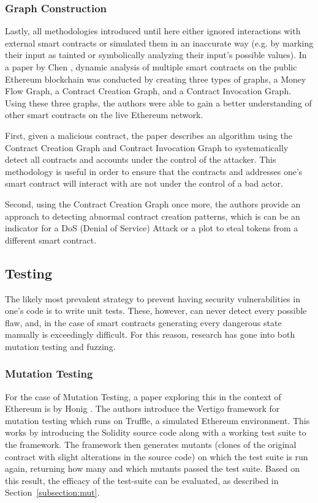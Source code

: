 \documentclass[letterpaper,twocolumn,10pt]{article}
\begin{document}
\subsubsection{Graph Construction}
Lastly, all methodologies introduced until here either ignored interactions with external smart contracts or simulated them in an inaccurate way (e.g. by marking their input as tainted or symbolically analyzing their input's possible values). In a paper by Chen \cite{chen_zhu_li_chen_li_luo_lin_zhange_2018}, dynamic analysis of multiple smart contracts on the public Ethereum blockchain was conducted by creating three types of graphs, a Money Flow Graph, a Contract Creation Graph, and a Contract Invocation Graph. Using these three graphs, the authors were able to gain a better understanding of other smart contracts on the live Ethereum network. 

\noindent First, given a malicious contract, the paper describes an algorithm using the Contract Creation Graph and Contract Invocation Graph to systematically detect all contracts and accounts under the control of the attacker. This methodology is useful in order to ensure that the contracts and addresses one's smart contract will interact with are not under the control of a bad actor.

\noindent Second, using the Contract Creation Graph once more, the authors provide an approach to detecting abnormal contract creation patterns, which is can be an indicator for a DoS (Denial of Service) Attack or a plot to steal tokens from a different smart contract. 


\subsection{Testing}
The likely most prevalent strategy to prevent having security vulnerabilities in one's code is to write unit tests. These, however, can never detect every possible flaw, and, in the case of smart contracts generating every dangerous state manually is exceedingly difficult. For this reason, research has gone into both mutation testing and fuzzing.


\subsubsection{Mutation Testing}

\noindent For the case of Mutation Testing, a paper exploring this in the context of Ethereum is by Honig \cite{honig_everts_huisman_2019}. The authors introduce the Vertigo framework for mutation testing which runs on Truffle, a simulated Ethereum environment. This works by introducing the Solidity source code along with a working test suite to the framework. The framework then generates mutants (clones of the original contract with slight alterations in the source code) on which the test suite is run again, returning how many and which mutants passed the test suite. Based on this result, the efficacy of the test-suite can be evaluated, as described in Section~\ref{subsection:mut}.
\end{document}

